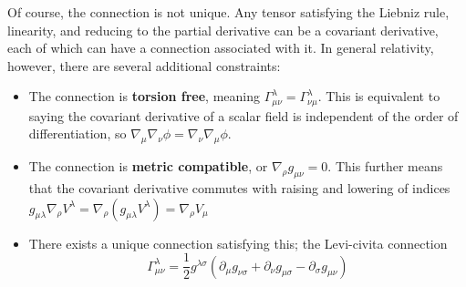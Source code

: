 \documentclass[11pt]{article}
\begin{document}
\noindent Of course, the connection is not unique. Any tensor satisfying the Liebniz rule, linearity, and reducing to the partial derivative can be a covariant derivative, each of which can have a connection associated with it. In general relativity, however, there are several additional constraints:
\begin{itemize}
    \item The connection is \textbf{torsion free}, meaning \(\Gamma^\lambda_{\mu \nu} = \Gamma^\lambda_{\nu \mu}\). This is equivalent to saying the covariant derivative of a scalar field is independent of the order of differentiation, so \(\nabla_\mu\nabla_\nu\phi = \nabla_\nu\nabla_\mu\phi\).

    \item The connection is \textbf{metric compatible}, or \(\nabla_\rho g_{\mu \nu} = 0\). This further means that the covariant derivative commutes with raising and lowering of indices \(g_{\mu \lambda} \nabla_\rho V^\lambda = \nabla_\rho (g_{\mu \lambda}V^\lambda) = \nabla_\rho V_\mu\)

    \item There exists a unique connection satisfying this; the Levi-civita connection
    \[
        \Gamma^\lambda_{\mu \nu} = \frac{1}{2} g^{\lambda \sigma} (\partial_\mu g_{\nu \sigma} + \partial_\nu g_{\mu \sigma} - \partial_\sigma g_{\mu \nu})
    \]
    
\end{itemize}
\end{document}
